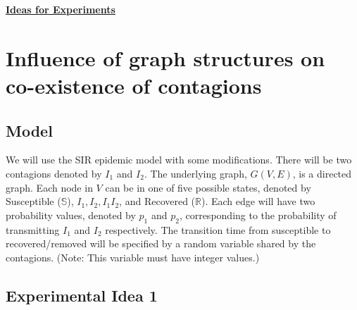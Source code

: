 \documentclass[11pt]{article}
\begin{document}
\newtheorem{theorem}{Theorem}[section]
\newtheorem{lemma}{Lemma}[section]
\newtheorem{corollary}{Corollary}[section]
\newtheorem{fact}{Fact}[section]
\newtheorem{definition}{Definition}[section]
\newtheorem{proposition}{Proposition}[section]
\newtheorem{observation}{Observation}[section]
\newtheorem{claim}{Claim}[section]

\newcommand{\cnp}{\textbf{NP}}
\newcommand{\true}{\texttt{True}}
\newcommand{\false}{\texttt{False}}

\newcommand{\QED}{\hfill\rule{2mm}{2mm}}

\newcommand{\irange}{\mbox{$1 \leq i \leq n$}}
\newcommand{\jrange}{\mbox{$1 \leq j \leq m$}}

\newcommand{\dunder}[1]{\underline{\underline{#1}}}

\setlength{\parskip}{3pt}

\normalbaselineskip

\newcommand{\sstate}{\mbox{$\mathbb{S}$}}
\newcommand{\istate}{\mbox{$\mathbb{I}$}}
\newcommand{\rstate}{\mbox{$\mathbb{R}$}}

\begin{center}
\dunder{\Large{\textbf{Ideas for Experiments}}}
\end{center}

\medskip

\section{Influence of graph structures on co-existence of contagions} 

\subsection{Model}

We will use the SIR epidemic model with some modifications.
There will be two contagions denoted by $I_{1}$ and $I_{2}$. The underlying
graph, $G(V,E)$, is a directed graph. Each node in $V$
can be in one of five possible states, 
denoted by Susceptible (\sstate), $I_{1}, I_{2}, I_{1}I_{2}$,
and Recovered (\rstate). 
Each edge will have two probability values, denoted by $p_1$
and $p_2$, corresponding to the probability of transmitting
$I_{1}$ and $I_{2}$ respectively.  
The transition time from
susceptible to recovered/removed will be specified by a random
variable shared by the contagions. 
(Note: This variable must have integer values.) 

\subsection{Experimental Idea 1}
\end{document}
